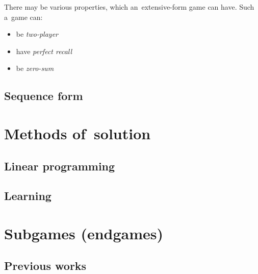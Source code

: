 There may be various properties, which an~extensive-form game can have.
Such a~game can:

\begin{itemize}
  \item be \emph{two-player}
  \item have \emph{perfect recall}
  \item be \emph{zero-sum}
\end{itemize}

\subsection{Sequence form}

\section{Methods of~solution}

\subsection{Linear programming}

\subsection{Learning}

\section{Subgames (endgames)}

\subsection{Previous works}
